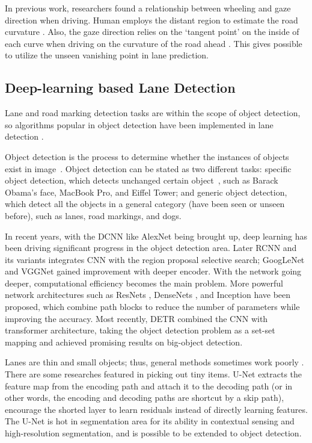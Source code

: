 \begin{spacing}{1.5}
In previous work, researchers found a relationship between wheeling and gaze direction when driving. Human employs the distant region to estimate the road curvature \cite{land1995parts}. Also, the gaze direction relies on the `tangent point' on the inside of each curve when driving on the curvature of the road ahead \cite{land1994we}. This gives possible to utilize the unseen vanishing point in lane prediction.

\subsection{Deep-learning based Lane Detection}

Lane and road marking detection tasks are within the scope of object detection, so algorithms popular in object detection have been implemented in lane detection \cite{tang2020review}. 

Object detection is the process to determine whether the instances of objects exist in image~\cite{liu2020deep}. Object detection can be stated as two different tasks: specific object detection, which detects unchanged certain object~\cite{zhang2013object}, such as Barack Obama’s face, MacBook Pro, and Eiffel Tower; and generic object detection, which detect all the objects in a general category (have been seen or unseen before), such as lanes, road markings, and dogs. 

In recent years, with the DCNN like AlexNet \cite{krizhevsky2012imagenet} being brought up, deep learning has been driving significant progress in the object detection area. Later RCNN and its variants \cite{girshick2014rich, girshick2015fast, ren2015faster} integrates CNN with the region proposal selective search; GoogLeNet \cite{szegedy2015going} and VGGNet \cite{simonyan2014very} gained improvement with deeper encoder. With the network going deeper, computational efficiency becomes the main problem. More powerful network architectures such as ResNets \cite{he2016deep}, DenseNets \cite{huang2017densely}, and Inception \cite{ioffe2015batch} have been proposed, which combine path blocks to reduce the number of parameters while improving the accuracy. Most recently, DETR \cite{carion2020end} combined the CNN with transformer architecture, taking the object detection problem as a set-set mapping and achieved promising results on big-object detection.

Lanes are thin and small objects; thus, general methods sometimes work poorly \cite{tang2020review}. There are some researches featured in picking out tiny items. U-Net \cite{ronneberger2015unet} extracts the feature map from the encoding path and attach it to the decoding path (or in other words, the encoding and decoding paths are shortcut by a skip path), encourage the shorted layer to learn residuals instead of directly learning features. The U-Net is hot in segmentation area for its ability in contextual sensing and high-resolution segmentation, and is possible to be extended to object detection.


\end{spacing}
